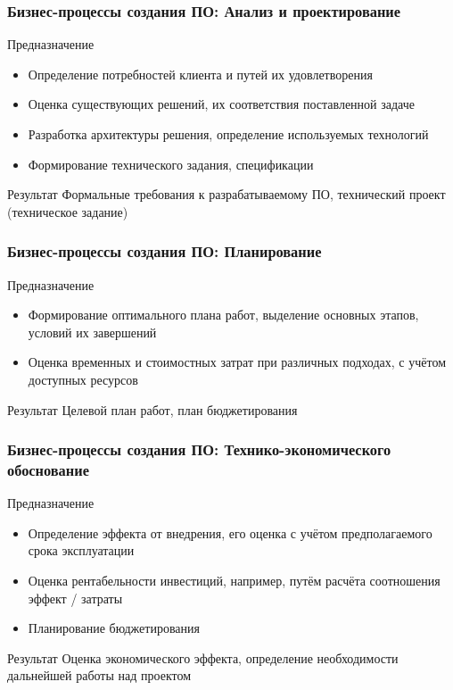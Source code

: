 \documentclass{../industrial-development}
\begin{document}
\begin{frame} \frametitle{Бизнес-процессы создания ПО: Анализ и проектирование}
	\begin{block}{Предназначение}
		\begin{itemize}
			\item Определение потребностей клиента и путей их удовлетворения
			\item Оценка существующих решений, их соответствия поставленной задаче
			\item Разработка архитектуры решения, определение используемых технологий
			\item Формирование технического задания, спецификации
		\end{itemize}
	\end{block}
	\begin{block}{Результат}
		Формальные требования к разрабатываемому ПО, технический проект (техническое задание)
	\end{block}
\end{frame}
\lecturenotes


\begin{frame} \frametitle{Бизнес-процессы создания ПО: Планирование}
	\begin{block}{Предназначение}
		\begin{itemize}
			\item Формирование оптимального плана работ, выделение основных этапов, условий их завершений
			\item Оценка временных и стоимостных затрат при различных подходах, с учётом доступных ресурсов
		\end{itemize}
	\end{block}
	\begin{block}{Результат}
		Целевой план работ, план бюджетирования
	\end{block}
\end{frame}
\lecturenotes


\begin{frame} \frametitle{Бизнес-процессы создания ПО: Технико-экономического обоснование}
	\begin{block}{Предназначение}
		\begin{itemize}
			\item Определение эффекта от внедрения, его оценка с учётом предполагаемого срока эксплуатации
			\item Оценка рентабельности инвестиций, например, путём расчёта соотношения эффект / затраты
			\item Планирование бюджетирования
		\end{itemize}
	\end{block}
	\begin{block}{Результат}
		Оценка экономического эффекта, определение необходимости дальнейшей работы над проектом
	\end{block}
\end{frame}
\lecturenotes
\end{document}
